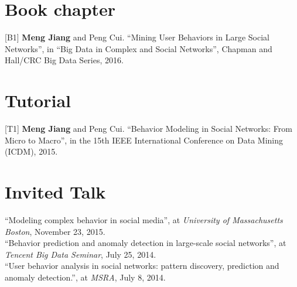 \documentclass[margin, 10pt]{res} %
\begin{document}
\begin{resume}

\section{Book chapter}

[B1] {\bf Meng Jiang} and Peng Cui. ``Mining User Behaviors in Large Social Networks'', in ``Big Data in Complex and Social Networks'', Chapman and Hall/CRC Big Data Series, 2016.


\section{Tutorial}

[T1] {\bf Meng Jiang} and Peng Cui. ``Behavior Modeling in Social Networks: From Micro to Macro'', in the 15th IEEE International Conference on Data Mining (ICDM), 2015.


\section{Invited Talk}

``Modeling complex behavior in social media'', at {\em University of Massachusetts Boston}, November 23, 2015. \\
``Behavior prediction and anomaly detection in large-scale social networks'', at {\em Tencent Big Data Seminar}, July 25, 2014. \\
``User behavior analysis in social networks: pattern discovery, prediction and anomaly detection.'', at {\em MSRA}, July 8, 2014.



\end{resume}
\end{document}
